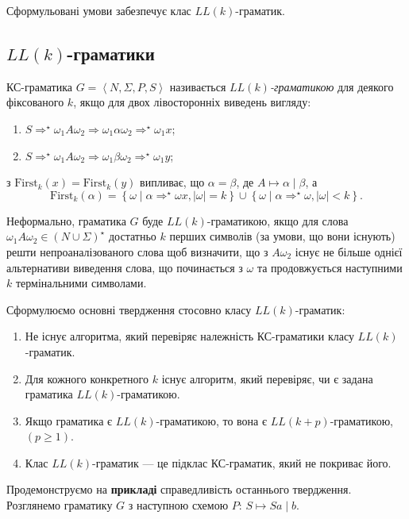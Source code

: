 Сформульовані умови забезпечує клас $LL(k)$-граматик.

\subsection{$LL(k)$-граматики}

КС-граматика $G = \left\langle N, \Sigma, P, S \right\rangle$ називається \textit{$LL(k)$-граматикою} для деякого фіксованого $k$, якщо для двох лівосторонніх виведень вигляду:
\begin{enumerate}
	\item $S \Rightarrow^\star \omega_1 A \omega_2 \Rightarrow \omega_1 \alpha \omega_2 \Rightarrow^\star \omega_1 x$;
	\item $S \Rightarrow^\star \omega_1 A \omega_2 \Rightarrow \omega_1 \beta \omega_2 \Rightarrow^\star \omega_1 y$;
\end{enumerate}
з $\text{First}_k (x) = \text{First}_k (y)$ випливає, що $\alpha = \beta$, де $A \mapsto \alpha \mid \beta$, а \[\text{First}_k(\alpha) = \left\{ \omega \mid \alpha \Rightarrow^\star \omega x,\vert\omega\vert = k \right\} \cup \left\{ \omega \mid \alpha \Rightarrow^\star \omega, \vert\omega\vert < k \right\}.\]

Неформально, граматика $G$ буде $LL(k)$-граматикою, якщо для слова $\omega_1 A \omega_2 \in (N \cup \Sigma)^\star$ достатньо $k$ перших символів (за умови, що вони існують) решти непроаналізованого слова щоб визначити, що з $A \omega_2$ існує не більше однієї альтернативи виведення слова, що починається з $\omega$ та продовжується наступними $k$ термінальними символами. \medskip

Сформулюємо основні твердження стосовно класу $LL(k)$-граматик:
\begin{enumerate}
	\item Не існує алгоритма, який перевіряє належність КС-граматики класу $LL(k)$-граматик.
	\item Для кожного конкретного $k$ існує алгоритм, який перевіряє, чи є задана граматика $LL(k)$-граматикою.
	\item Якщо граматика є $LL(k)$-граматикою, то вона є $LL(k + p)$-граматикою, $(p \ge 1)$.
	\item Клас $LL(k)$-граматик --- це підклас КС-граматик, який не покриває його.
\end{enumerate}

Продемонструємо на \textbf{прикладі} справедливість останнього твердження. Розглянемо граматику $G$ з наступною схемою $P$: $S \mapsto S a \mid b$. \medskip

